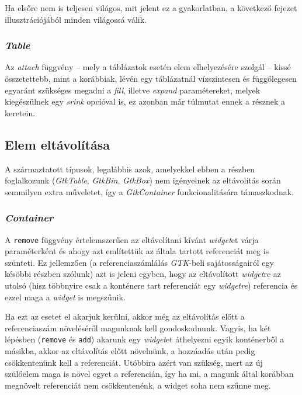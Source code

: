 \documentclass[a4paper,10pt]{article}
\begin{document}
Ha elsőre nem is teljesen világos, mit jelent ez a gyakorlatban, a következő fejezet illusztrációjából minden világossá válik.

\subsubsection{\textit{Table}}

Az \textit{attach} függvény -- mely a táblázatok esetén elem elhelyezésére szolgál -- kissé összetettebb, mint a korábbiak, lévén egy táblázatnál vízszintesen és függőlegesen egyaránt szükséges megadni a \textit{fill}, illetve \textit{expand} paramétereket, melyek kiegészülnek egy \textit{srink} opcióval is, ez azonban már túlmutat ennek a résznek a keretein.

\subsection{Elem eltávolítása}

A származtatott típusok, legalábbis azok, amelyekkel ebben a részben foglalkozunk (\textit{GtkTable}, \textit{GtkBin}, \textit{GtkBox}) nem igényelnek az eltávolítás során semmilyen extra műveletet, így a \textit{GtkContainer} funkcionalitására támaszkodnak.

\subsubsection{\textit{Container}}

A \texttt{remove} függvény értelemszerűen az eltávolítani kívánt \textit{widget}et várja paraméterként és ahogy azt említettük az általa tartott referenciát meg is szünteti. Ez jellemzően (a referenciaszámlálás \textit{GTK}-beli sajátosságairól egy késöbbi részben szólunk) azt is jeleni egyben, hogy az eltávolított \textit{widget}re az utolsó (hisz többnyire csak a konténere tart referenciát egy \textit{widgetre}) referencia és ezzel maga a \textit{widget} is megszűnik.

Ha ezt az esetet el akarjuk kerülni, akkor még az eltávolítás előtt a referenciaszám növeléséről magunknak kell gondoskodnunk. Vagyis, ha két lépésben (\texttt{remove} és \texttt{add}) akarunk egy \textit{widget}et áthelyezni egyik konténerből a másikba, akkor az eltávolítás előtt növelnünk, a hozzáadás után pedig csökkentenünk kell a referenciát. Utóbbira azért van szükség, mert az új szülőelem maga is növel egyet a referencián, így ha mi, a magunk által korábban megnövelt referenciát nem csökkentenénk, a widget soha nem szűnne meg.
\end{document}
